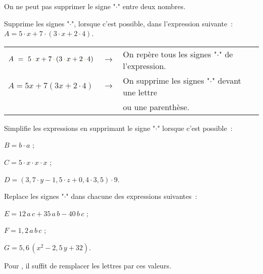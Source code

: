 \begin{methode*1}

\begin{remarque}
On ne peut pas supprimer le signe "$\cdot$" entre deux nombres.
\end{remarque}
 
\begin{exemple*1}
Supprime les signes "$\cdot$", lorsque c'est possible, dans l'expression suivante : $A = 5 \cdot x + 7 \cdot (3 \cdot x + 2 \cdot 4)$.
\begin{center}
 \begin{tabular}{lcl}
$A = 5\,\textcolor{H1}{\cdot}\,x + 7\,\textcolor{H1}{\cdot}\,(3\,\textcolor{H1}{\cdot}\,x + 2\,\textcolor{H1}{\cdot}\,4)$ & $\longrightarrow$ & On repère tous les signes "\textcolor{H1}{$\cdot$}" de l'expression. \\ %
$A = 5x + 7(3x + 2 \cdot 4)$ & $\longrightarrow$ & On supprime les signes "\textcolor{H1}{$\cdot$}" devant une lettre \\ %
& &  ou une parenthèse. \\
  \end{tabular}
 \end{center}
\end{exemple*1}

\exercice  
Simplifie les expressions en supprimant le signe "$\cdot$" lorsque c'est possible :

$B = b \cdot a$ ;

$C = 5 \cdot x \cdot x \cdot x$ ;

$D = (3,7 \cdot y - 1,5 \cdot z + 0,4 \cdot 3,5) \cdot 9$.

\exercice  
Replace les signes "$\cdot$" dans chacune des expressions suivantes :

$E = 12\,a\,c + 35\,a\,b - 40\,b\,c$ ;

$F = 1,2\,a\,b\,c$ ;

$G = 5,6\,(x^2 - 2,5\,y + 32)$.

\end{methode*1}
 
 
\begin{aconnaitre}
Pour , il suffit de remplacer les lettres par ces valeurs.
\end{aconnaitre}

